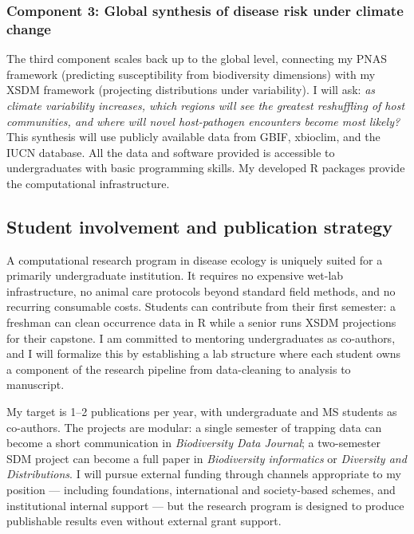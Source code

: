 \documentclass[11pt,letterpaper]{article}
\begin{document}
\subsubsection*{Component 3: Global synthesis of disease risk under
climate
change}\label{component-3-global-synthesis-of-disease-risk-under-climate-change}

The third component scales back up to the global level, connecting my
PNAS framework (predicting susceptibility from biodiversity dimensions)
with my XSDM framework (projecting distributions under variability). I
will ask: \emph{as climate variability increases, which regions will see
the greatest reshuffling of host communities, and where will novel
host-pathogen encounters become most likely?} This synthesis will use
publicly available data from GBIF, xbioclim, and the IUCN
database. All the data and software provided is accessible to undergraduates with basic programming skills. My developed R packages provide the computational infrastructure.

\subsection*{Student involvement and publication
strategy}\label{student-involvement-and-publication-strategy}

A computational research program in disease ecology is uniquely suited
for a primarily undergraduate institution. It requires no expensive
wet-lab infrastructure, no animal care protocols beyond standard field
methods, and no recurring consumable costs. Students can contribute from
their first semester: a freshman can clean occurrence data in R while a
senior runs XSDM projections for their capstone. I am committed to
mentoring undergraduates as co-authors, and I will formalize this by
establishing a lab structure where each student owns a component of the
research pipeline from data-cleaning to analysis to manuscript.

My target is 1--2 publications per year, with undergraduate and MS
students as co-authors. The projects are modular: a single semester of
trapping data can become a short communication in \emph{Biodiversity
Data Journal}; a two-semester SDM project can become a full paper in
\emph{Biodiversity informatics} or \emph{Diversity and Distributions}. I will pursue external funding through channels appropriate to my position --- including foundations, international and society-based schemes, and institutional internal support --- but the research program is designed to produce publishable results even without external grant support.
\end{document}
